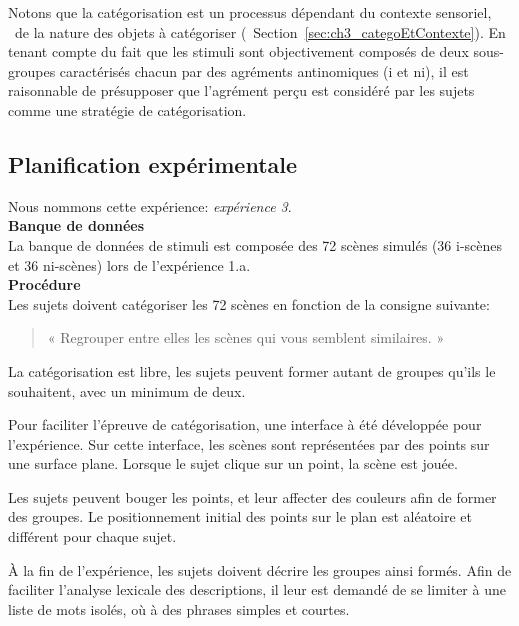 Notons que la catégorisation est un processus dépendant du contexte sensoriel, \ie~de la nature des objets à catégoriser (\cf~Section~\ref{sec:ch3_categoEtContexte}). En tenant compte du fait que les stimuli sont objectivement composés de deux sous-groupes caractérisés chacun par des agréments antinomiques (i et ni), il est raisonnable de présupposer que l'agrément perçu est considéré par les sujets comme une stratégie de catégorisation.

\subsection{Planification expérimentale}

Nous nommons cette expérience: \emph{expérience 3}. \\

{\setlength{\parindent}{0cm}\textbf{Banque de données}} \\ 

La banque de données de stimuli est composée des 72 scènes simulés (36 i-scènes et 36 ni-scènes) lors de l'expérience 1.a. \\ 

{\setlength{\parindent}{0cm}\textbf{Procédure}} \\

Les sujets doivent catégoriser les 72 scènes en fonction de la consigne suivante:

\begin{quote}
« Regrouper entre elles les scènes qui vous semblent similaires. »
\end{quote}

La catégorisation est libre, les sujets peuvent former autant de groupes qu'ils le souhaitent, avec un minimum de deux. 

Pour faciliter l'épreuve de catégorisation, une interface à été développée pour l'expérience. Sur cette interface, les scènes sont représentées par des points sur une surface plane. Lorsque le sujet clique sur un point, la scène est jouée.

Les sujets peuvent bouger les points, et leur affecter des couleurs afin de former des groupes. Le positionnement initial des points sur le plan est aléatoire et différent pour chaque sujet.

À la fin de l'expérience, les sujets doivent décrire les groupes ainsi formés. Afin de faciliter l'analyse lexicale des descriptions, il leur est demandé de se limiter à une liste de mots isolés, où à des phrases simples et courtes.

